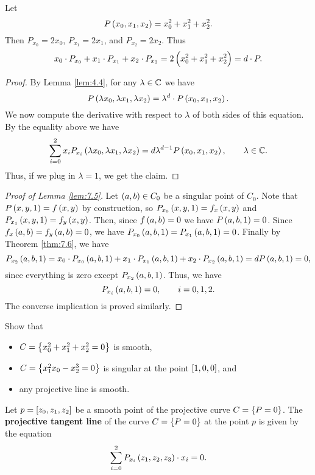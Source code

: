 \begin{example*}
Let
$$ P\br{x_0, x_1, x_2} = x_0^2 + x_1^2 + x_2^2. $$
Then $ P_{x_0} = 2x_0 $, $ P_{x_1} = 2x_1 $, and $ P_{x_2} = 2x_2 $. Thus
$$ x_0 \cdot P_{x_0} + x_1 \cdot P_{x_1} + x_2 \cdot P_{x_2} = 2\br{x_0^2 + x_1^2 + x_2^2} = d \cdot P. $$
\end{example*}

\begin{proof}
By Lemma \ref{lem:4.4}, for any $ \lambda \in \mathbb{C} $ we have
$$ P\br{\lambda x_0, \lambda x_1, \lambda x_2} = \lambda^d \cdot P\br{x_0, x_1, x_2}. $$
We now compute the derivative with respect to $ \lambda $ of both sides of this equation. By the equality above we have
$$ \sum_{i = 0}^2 x_iP_{x_i}\br{\lambda x_0, \lambda x_1, \lambda x_2} = d\lambda^{d - 1}P\br{x_0, x_1, x_2}, \qquad \lambda \in \CC. $$
Thus, if we plug in $ \lambda = 1 $, we get the claim.
\end{proof}

\begin{proof}[Proof of Lemma \ref{lem:7.5}]
Let $ \br{a, b} \in C_0 $ be a singular point of $ C_0 $. Note that $ P\br{x, y, 1} = f\br{x, y} $ by construction, so $ P_{x_0}\br{x, y, 1} = f_x\br{x, y} $ and $ P_{x_1}\br{x, y, 1} = f_y\br{x, y} $. Then, since $ f\br{a, b} = 0 $ we have $ P\br{a, b, 1} = 0 $. Since $ f_x\br{a, b} = f_y\br{a, b} = 0 $, we have $ P_{x_0}\br{a, b, 1} = P_{x_1}\br{a, b, 1} = 0 $. Finally by Theorem \ref{thm:7.6}, we have
$$ P_{x_2}\br{a, b, 1} = x_0 \cdot P_{x_0}\br{a, b, 1} + x_1 \cdot P_{x_1}\br{a, b, 1} + x_2 \cdot P_{x_2}\br{a, b, 1} = dP\br{a, b, 1} = 0, $$
since everything is zero except $ P_{x_2}\br{a, b, 1} $. Thus, we have
$$ P_{x_i}\br{a, b, 1} = 0, \qquad i = 0, 1, 2. $$
The converse implication is proved similarly.
\end{proof}

\begin{exercise**}
Show that
\begin{itemize}
\item $ C = \cbr{x_0^2 + x_1^2 + x_2^2 = 0} $ is smooth,
\item $ C = \cbr{x_1^2x_0 - x_2^3 = 0} $ is singular at the point $ \sbr{1, 0, 0} $, and
\item any projective line is smooth.
\end{itemize}
\end{exercise**}

\begin{definition}
Let $ p = \sbr{z_0, z_1, z_2} $ be a smooth point of the projective curve $ C = \cbr{P = 0} $. The \textbf{projective tangent line} of the curve $ C = \cbr{P = 0} $ at the point $ p $ is given by the equation
\begin{equation}
\label{eq:5}
\sum_{i = 0}^2 P_{x_i}\br{z_1, z_2, z_3} \cdot x_i = 0.
\end{equation}
\end{definition}

